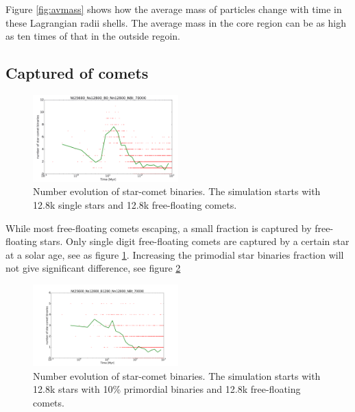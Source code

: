 \documentclass[usenatbib]{mn2e}
\begin{document}
Figure  \ref{fig:avmass} shows how the average mass of particles change with time in these Lagrangian radii shells. The average mass in the core region can be as high as ten times of that in the outside regoin.




\subsection{Captured of comets}

\begin{figure}
  \centering
  \includegraphics[width=0.5\textwidth,height=!]{Ns_c.png}
  \caption{Number evolution of star-comet binaries. The simulation starts with 12.8k single stars and 12.8k free-floating comets.}
  \label{fig:Ns_c}
\end{figure}

While most free-floating comets escaping, a small fraction is captured by free-floating stars. Only single digit free-floating comets are captured by a certain star at a solar age, see as figure \ref{fig:Ns_c}. Increasing the primodial star binaries fraction will not give significant difference, see figure \ref{fig:Ns_c10}
\begin{figure}
  \centering
  \includegraphics[width=0.5\textwidth,height=!]{Ns_c10}
  \caption{Number evolution of star-comet binaries. The simulation starts with 12.8k stars with 10\% primordial binaries and 12.8k free-floating comets.}
  \label{fig:Ns_c10}
\end{figure}
\end{document}
